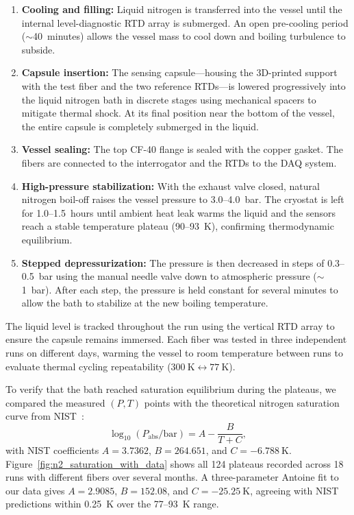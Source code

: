 \documentclass[preprint,11pt]{elsarticle}
\begin{document}
\begin{enumerate}
    \item \textbf{Cooling and filling:} Liquid nitrogen is transferred into the vessel until the internal level-diagnostic RTD array is submerged. An open pre-cooling period ($\sim$40~minutes) allows the vessel mass to cool down and boiling turbulence to subside.
    \item \textbf{Capsule insertion:} The sensing capsule---housing the 3D-printed support with the test fiber and the two reference RTDs---is lowered progressively into the liquid nitrogen bath in discrete stages using mechanical spacers to mitigate thermal shock. At its final position near the bottom of the vessel, the entire capsule is completely submerged in the liquid.
    \item \textbf{Vessel sealing:} The top CF-40 flange is sealed with the copper gasket. The fibers are connected to the interrogator and the RTDs to the DAQ system.
    \item \textbf{High-pressure stabilization:} With the exhaust valve closed, natural nitrogen boil-off raises the vessel pressure to 3.0--4.0~bar. The cryostat is left for 1.0--1.5~hours until ambient heat leak warms the liquid and the sensors reach a stable temperature plateau (90--93~K), confirming thermodynamic equilibrium.
    \item \textbf{Stepped depressurization:} The pressure is then decreased in steps of 0.3--0.5~bar using the manual needle valve down to atmospheric pressure ($\sim$1~bar). After each step, the pressure is held constant for several minutes to allow the bath to stabilize at the new boiling temperature.
\end{enumerate}

The liquid level is tracked throughout the run using the vertical RTD array to ensure the capsule remains immersed. Each fiber was tested in three independent runs on different days, warming the vessel to room temperature between runs to evaluate thermal cycling repeatability ($300~\text{K} \leftrightarrow 77~\text{K}$).

To verify that the bath reached saturation equilibrium during the plateaus, we compared the measured $(P, T)$ points with the theoretical nitrogen saturation curve from NIST~\cite{Lemmon2025NIST,Edejer1967}:
\begin{equation}
    \log_{10}(P_{\text{abs}}/\text{bar}) = A - \frac{B}{T + C},
    \label{eq:antoine}
\end{equation}
with NIST coefficients $A = 3.7362$, $B = 264.651$, and $C = -6.788~\text{K}$. Figure~\ref{fig:n2_saturation_with_data} shows all 124 plateaus recorded across 18 runs with different fibers over several months. A three-parameter Antoine fit to our data gives $A = 2.9085$, $B = 152.08$, and $C = -25.25~\text{K}$, agreeing with NIST predictions within 0.25~K over the 77--93~K range.
\end{document}
